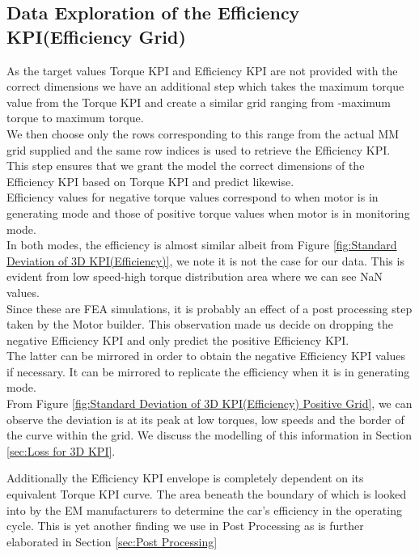 \documentclass{report} %
\begin{document}
\subsection{Data Exploration of the Efficiency \ac{KPI}(Efficiency Grid)}\label{sec:Deep Dive into 3D KPI}

As the target values Torque \ac{KPI} and Efficiency \ac{KPI} are not provided with the correct dimensions we have an additional step which takes the maximum torque value from the Torque \ac{KPI} and create a similar grid ranging from -maximum torque to maximum torque. \\
We then choose only the rows corresponding to this range from the actual MM grid supplied and the same row indices is used to retrieve the Efficiency \ac{KPI}. \\
This step ensures that we grant the model the correct dimensions of the Efficiency \ac{KPI} based on Torque \ac{KPI} and predict likewise.\\

Efficiency values for negative torque values correspond to when motor is in generating mode and those of positive torque values when motor is in monitoring mode.\\
In both modes, the efficiency is almost similar albeit from Figure \ref{fig:Standard Deviation of 3D KPI(Efficiency)}, we note it is not the case for our data. 
This is evident from low speed-high torque distribution area where we can see \ac{NaN} values.\\
Since these are \ac{FEA} simulations, it is probably an effect of a post processing step taken by the Motor builder.
This observation made us decide on dropping the negative Efficiency \ac{KPI} and only predict the positive Efficiency \ac{KPI}.\\
The latter can be mirrored in order to obtain the negative Efficiency \ac{KPI} values if necessary.
It can be mirrored to replicate the efficiency when it is in generating mode.\\

From Figure \ref{fig:Standard Deviation of 3D KPI(Efficiency) Positive Grid}, we can observe the deviation is at its peak at low torques, low speeds and the border of the curve within the grid.
We discuss the modelling of this information in Section \ref{sec:Loss for 3D KPI}.

Additionally the Efficiency \ac{KPI} envelope is completely dependent on its equivalent Torque \ac{KPI} curve. 
The area beneath the boundary of which is looked into by the \ac{EM} manufacturers to determine the car's efficiency in the operating cycle.
This is yet another finding we use in Post Processing as is further elaborated in Section \ref{sec:Post Processing}
\end{document}
